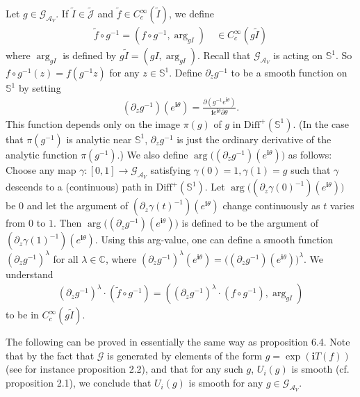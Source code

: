 \documentclass[12pt,a4paper]{article}
\theoremstyle{definition}
\theoremstyle{plain}
\newcommand{\wtd}{\widetilde}
\newcommand{\Diffp}{\mathrm{Diff}^+}
\newcommand{\GAV}{\mathscr G_{\mathcal A_V}}
\newcommand{\scr}{\mathscr}
\newcommand{\Jtd}{\widetilde{\mathcal J}}
\newcommand{\im}{\mathbf{i}}
\newcommand{\mbb}{\mathbb}
\numberwithin{equation}{subsection}
\begin{document}
Let $g\in\GAV$. If $\wtd I\in\Jtd$ and $\wtd f\in C_c^\infty(\wtd I)$, we define 
\begin{align}
\wtd f\circ g^{-1}=(f\circ g^{-1},\arg_{gI})\quad \in C_c^\infty(g\wtd I)
\end{align}
where $\arg_{gI}$ is defined by $g\wtd I=(gI,\arg_{gI})$.  Recall that $\GAV$ is acting on $\mbb S^1$. So $f\circ g^{-1}(z)=f(g^{-1}z)$ for any $z\in\mbb S^1$. Define $\partial_zg^{-1}$ to be a smooth function on $\mbb S^1$ by setting
\begin{align}
(\partial_zg^{-1})(e^{\im \theta})=\frac{\partial (g^{-1}e^{\im\theta})}{\im e^{\im\theta}\partial\theta}.
\end{align}
This function depends only on the image $\pi(g)$ of $g$ in $\Diffp(\mbb S^1)$. (In the case that $\pi(g^{-1})$ is analytic near $\mbb S^1$, $\partial_zg^{-1}$ is just the ordinary derivative of the analytic function $\pi(g^{-1})$.) We also define $\arg \big((\partial_zg^{-1})(e^{\im \theta})\big)$ as follows: Choose any map  $\gamma:[0,1]\rightarrow\GAV$ satisfying $\gamma(0)=1,\gamma(1)=g$ such that $\gamma$ descends to a (continuous) path in $\Diffp(\mbb S^1)$. Let  $\arg \big((\partial_z\gamma(0)^{-1})(e^{\im \theta})\big)$ be $0$ and let the argument of $(\partial_z\gamma(t)^{-1})(e^{\im \theta})$ change continuously as $t$ varies from $0$ to $1$. Then $\arg \big((\partial_zg^{-1})(e^{\im \theta})\big)$ is defined to be the argument of $(\partial_z\gamma(1)^{-1})(e^{\im \theta})$. Using this arg-value, one can define a smooth function $(\partial_zg^{-1})^\lambda$ for all $\lambda\in\mbb C$, where $(\partial_zg^{-1})^\lambda(e^{\im\theta})=\big((\partial_zg^{-1})(e^{\im \theta})\big)^\lambda$. We understand
\begin{align*}
(\partial_zg^{-1})^\lambda\cdot  (\wtd f\circ g^{-1})=((\partial_zg^{-1})^\lambda\cdot(f\circ g^{-1}),\arg_{gI})
\end{align*}
to be in $C_c^\infty(g\wtd I)$. 

The following can be proved in essentially the same way as \cite{CKLW18} proposition 6.4. Note that  by the fact that $\scr G$ is generated by elements of the form $g=\exp(\im T(f))$ (see for instance \cite{Gui21a} proposition 2.2), and that for any such $g$, $U_i(g)$ is smooth (cf. \cite{TL99} proposition 2.1), we conclude that $U_i(g)$ is smooth for any $g\in\GAV$.
\end{document}
